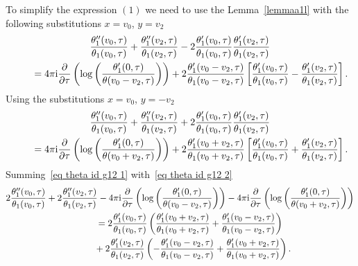 \documentclass[pdftex]{sigma}%
\numberwithin{equation}{section}
\begin{document}
To simplify the expression $(1)$ we need to use the Lemma~\ref{lemmaa1l} with the following substitutions $x=v_0$, $y=v_2$
\begin{gather}
\frac{\theta_1^{\prime\prime}(v_0,\tau)}{\theta_1(v_0,\tau)} +\frac{\theta_1^{\prime\prime}(v_2,\tau)}{\theta_1(v_2,\tau)} -2\frac{\theta_1^{\prime}(v_0,\tau)}{\theta_1(v_0,\tau)} \frac{\theta_1^{\prime}(v_2,\tau)}{\theta_1(v_2,\tau)}\nonumber
\\ \qquad
{}=4\pi {\rm i} \frac{\partial}{\partial \tau}\left(\log\left(\frac{\theta_1^{\prime}(0,\tau)}{\theta(v_0-v_2,\tau)}\right)\right)
+2\frac{\theta_1^{\prime}(v_0-v_2,\tau)}{\theta_1(v_0-v_2,\tau)} \left[\frac{\theta_1^{\prime}(v_0,\tau)}{\theta_1(v_0,\tau)} -\frac{\theta_1^{\prime}(v_2,\tau)}{\theta_1(v_2,\tau)}\right].
\label{eq theta id g12 1}
\end{gather}
Using the substitutions $x=v_0$, $y=-v_2$
\begin{gather}
\frac{\theta_1^{\prime\prime}(v_0,\tau)}{\theta_1(v_0,\tau)} +\frac{\theta_1^{\prime\prime}(v_2,\tau)}{\theta_1(v_2,\tau)} +2\frac{\theta_1^{\prime}(v_0,\tau)}{\theta_1(v_0,\tau)} \frac{\theta_1^{\prime}(v_2,\tau)}{\theta_1(v_2,\tau)}\nonumber
\\ \qquad
{}=4\pi {\rm i} \frac{\partial}{\partial \tau}\left(\log\left(\frac{\theta_1^{\prime}(0,\tau)}{\theta(v_0+v_2,\tau)}\right)\right) +2\frac{\theta_1^{\prime}(v_0+v_2,\tau)}{\theta_1(v_0+v_2,\tau)} \left[\frac{\theta_1^{\prime}(v_0,\tau)}{\theta_1(v_0,\tau)} +\frac{\theta_1^{\prime}(v_2,\tau)}{\theta_1(v_2,\tau)}\right].
\label{eq theta id g12 2}
\end{gather}
Summing~\eqref{eq theta id g12 1} with~\eqref{eq theta id g12 2}
\begin{gather*}
2\frac{\theta_1^{\prime\prime}(v_0,\tau)}{\theta_1(v_0,\tau)} +2\frac{\theta_1^{\prime\prime}(v_2,\tau)}{\theta_1(v_2,\tau)} -4\pi {\rm i} \frac{\partial}{\partial \tau}\left( \log\left(\frac{\theta_1^{\prime}(0,\tau)}{\theta(v_0-v_2,\tau)}\right)\right)
-4\pi {\rm i} \frac{\partial}{\partial \tau}\left( \log\left(\frac{\theta_1^{\prime}(0,\tau)}{\theta(v_0+v_2,\tau)}\right)\right)
\\ \qquad
{}=2\frac{\theta_1^{\prime}(v_0,\tau)}{\theta_1(v_0,\tau)} \left(\frac{\theta_1^{\prime}(v_0+v_2,\tau)}{\theta_1(v_0+v_2,\tau)} +\frac{\theta_1^{\prime}(v_0-v_2,\tau)}{\theta_1(v_0-v_2,\tau)}\right)
\\ \qquad \phantom{=}
+2\frac{\theta_1^{\prime}(v_2,\tau)}{\theta_1(v_2,\tau)} \left(-\frac{\theta_1^{\prime}(v_0-v_2,\tau)}{\theta_1(v_0-v_2,\tau)} +\frac{\theta_1^{\prime}(v_0+v_2,\tau)}{\theta_1(v_0+v_2,\tau)}\right).
\end{gather*}
\end{document}
